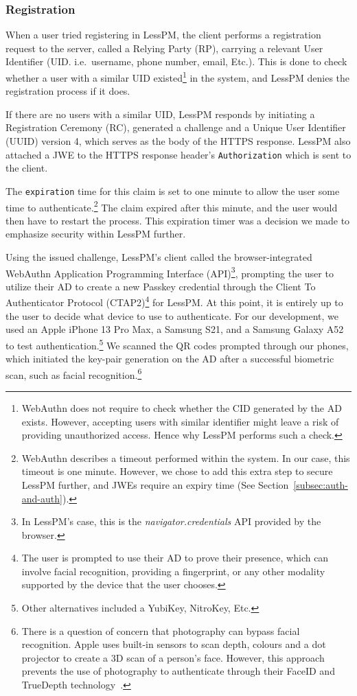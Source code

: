 \subsubsection{Registration}\label{subsubsec:metho-registration}
When a user tried registering in LessPM, the client performs a
registration request to the server, called a Relying Party (RP), carrying a
relevant User Identifier (UID. i.e.\ username, phone number, email, Etc.).
This is done to check whether a user with a similar UID existed\footnote{
  WebAuthn does not require to check whether the CID generated by the AD exists.
  However, accepting users with similar identifier might leave a risk of
  providing unauthorized access.
  Hence why LessPM performs such a check.
} in the system, and LessPM denies the registration process if it does.

If there are no users with a similar UID, LessPM responds by initiating a
Registration Ceremony (RC), generated a challenge and a Unique User
Identifier (UUID) version 4, which serves as the body of the HTTPS response.
LessPM also attached a JWE to the HTTPS response header's
\texttt{Authorization} which is sent to the client.

The \texttt{expiration} time for this claim is set to one minute to allow the
user some time to authenticate.\footnote{
  WebAuthn describes a timeout performed within the system. In our case, this
  timeout is one minute.
  However, we chose to add this extra step to secure LessPM further, and
  JWEs require an expiry time (See Section~\ref{subsec:auth-and-auth}).
}
The claim expired after this minute, and the user would then have to restart the
process.
This expiration timer was a decision we made to emphasize security within LessPM
further.

Using the issued challenge, LessPM's client called the browser-integrated
WebAuthn Application Programming Interface (API)\footnote{
  In LessPM's case, this is the \textit{navigator.credentials} API provided by
  the browser.
},
prompting the user to utilize their AD to create a new Passkey credential
through the Client To Authenticator Protocol (CTAP2)\footnote{
  The user is prompted to use their AD to prove their presence, which can
  involve facial recognition, providing a fingerprint, or any other modality
  supported by the device that the user chooses.
} for
LessPM\@.
At this point, it is entirely up to the user to decide what device to use to
authenticate.
For our development, we used an Apple iPhone 13 Pro Max, a Samsung S21, and a
Samsung Galaxy A52 to test authentication.\footnote{
  Other alternatives included a YubiKey, NitroKey, Etc.
}
We scanned the QR codes prompted through our phones, which initiated the
key-pair generation on the AD after a successful biometric scan, such as
facial recognition.\footnote{
  There is a question of concern that photography can bypass facial recognition.
  Apple uses built-in sensors to scan depth, colours and a dot projector to
  create a 3D scan of a person's face.
  However, this approach prevents the use of photography to authenticate through
  their FaceID and TrueDepth technology~\cite{apple-support}.
}

